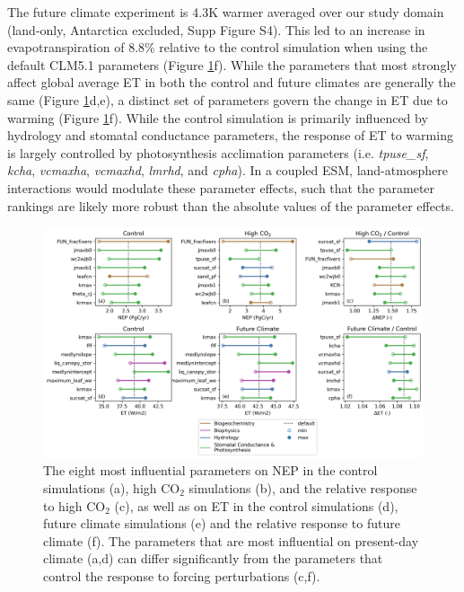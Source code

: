 \documentclass[draft]{agujournal2019}
\begin{document}
The future climate experiment is 4.3K warmer averaged over our study domain (land-only, Antarctica excluded, Supp Figure S4). This led to an increase in evapotranspiration of 8.8\% relative to the control simulation when using the default CLM5.1 parameters (Figure \ref{fig:nep}f). While the parameters that most strongly affect global average ET in both the control and future climates are generally the same (Figure \ref{fig:nep}d,e), a distinct set of parameters govern the change in ET due to warming (Figure \ref{fig:nep}f). While the control simulation is primarily influenced by hydrology and stomatal conductance parameters, the response of ET to warming is largely controlled by photosynthesis acclimation parameters (i.e. \textit{tpuse\_sf}, \textit{kcha}, \textit{vcmaxha}, \textit{vcmaxhd}, \textit{lmrhd}, and \textit{cpha}). In a coupled ESM, land-atmosphere interactions would modulate these parameter effects, such that the parameter rankings are likely more robust than the absolute values of the parameter effects.

\begin{figure}[h]
\centering
\includegraphics[width=\textwidth]{../figs/main/deltas.png}
\caption{The eight most influential parameters on NEP in the control simulations (a), high CO$_2$ simulations (b), and the relative response to high CO$_2$ (c), as well as on ET in the control simulations (d), future climate simulations (e) and the relative response to future climate (f). The parameters that are most influential on present-day climate (a,d) can differ significantly from the parameters that control the response to forcing perturbations (c,f).}
\label{fig:nep}
\end{figure}
\end{document}
